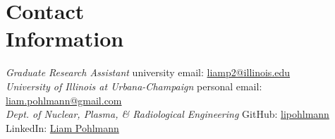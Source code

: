   \section{\mysidestyle Contact\\Information}
  \textsl{Graduate Research Assistant}
  \hfill university email: \href{mailto:liamp2@illinois.edu}{liamp2@illinois.edu}\\
  \textsl{University of Illinois at Urbana-Champaign}
  \hfill personal email: \href{mailto:liam.pohlmann@gmail.com}{liam.pohlmann@gmail.com}\\
  \textsl{Dept. of Nuclear, Plasma, \& Radiological Engineering}
  \hfill GitHub: \href{https://github.com/lipohlmann}{\faGithub lipohlmann}\\
  \vspace{0mm} \hfill LinkedIn: \href{https://www.linkedin.com/in/liam-pohlmann-34b000297/}{\faLinkedin Liam Pohlmann}

